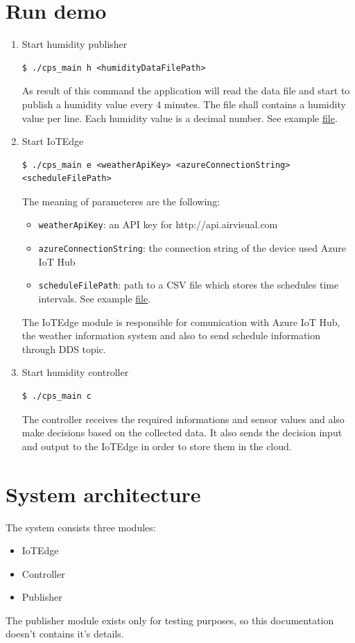 \documentclass{article}
\begin{document}
\section{Run demo}
\begin{enumerate}
\item Start humidity publisher
\begin{verbatim}
$ ./cps_main h <humidityDataFilePath>
\end{verbatim}
As result of this command the application will read the data file and start to publish a humidity value every 4 minutes. The file shall contains a humidity value per line. Each humidity value is a decimal number. See example \href{https://github.com/antaljanosbenjamin/cps_homework/blob/master/examples/humidity.txt}{file}.
\item Start IoTEdge 
\begin{lstlisting}
$ ./cps_main e <weatherApiKey> <azureConnectionString> <scheduleFilePath>
\end{lstlisting} 
The meaning of parameteres are the following:
\begin{itemize}
\item \verb+weatherApiKey+: an API key for http://api.airvisual.com
\item \verb+azureConnectionString+: the connection string of the device used Azure IoT Hub
\item \verb+scheduleFilePath+: path to a CSV file which stores the schedules time intervals. See example \href{https://github.com/antaljanosbenjamin/cps_homework/blob/master/examples/schedule.csv}{file}.
\end{itemize}
The IoTEdge module is responsible for comunication with Azure IoT Hub, the weather information system and also to send schedule information through DDS topic.
\item Start humidity controller
\begin{verbatim}
$ ./cps_main c
\end{verbatim}
The controller receives the required informations and sensor values and also make decisions based on the collected data. It also sends the decision input and output to the IoTEdge in order to store them in the cloud.
\end{enumerate}
\section{System architecture}
The system consists three modules:
\begin{itemize}
\item IoTEdge
\item Controller
\item Publisher
\end{itemize}
The publisher module exists only for testing purposes, so this documentation doesn't contains it's details.
\end{document}

